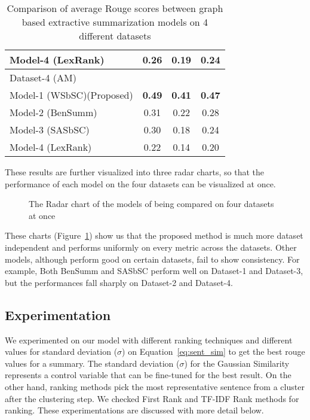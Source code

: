 \begin{table}[]
\begin{tabular}{lccc}
         Model-4 (LexRank)~\cite{Erkan-lexRank-2004}                    & 0.26          & 0.19          & 0.24          \\\hline
         Dataset-4 (AM)                                                 &               &               &               \\\hline
         Model-1 (WSbSC)(Proposed)                                      & \textbf{0.49} & \textbf{0.41} & \textbf{0.47} \\
         Model-2 (BenSumm)~\cite{chowdhury-etal-2021-tfidf-clustering}  & 0.31          & 0.22          & 0.28          \\
         Model-3 (SASbSC)~\cite{roychowdhury-etal-2022-spectral-base}   & 0.30          & 0.18          & 0.24          \\
         Model-4 (LexRank)~\cite{Erkan-lexRank-2004}                    & 0.22          & 0.14          & 0.20          \\
    \end{tabular}
    \caption{Comparison of average Rouge scores between graph based extractive summarization models on 4 different datasets}
    \label{tab:result_comparison-1}
\end{table}

These results are further visualized into three radar charts,
so that the performance of each model on the four datasets can be visualized at once.

\begin{figure}
    \centering
    
    \caption{The Radar chart of the models of being compared on four datasets at once}
    \label{fig:radarchart}
 \end{figure}

These charts (Figure~\ref{fig:radarchart})
show us that the proposed method is much more dataset independent and performs
uniformly on every metric across the datasets.
Other models, although perform good on certain datasets, fail to show consistency.
For example, Both BenSumm and SASbSC perform well on Dataset-1 and Dataset-3, but
the performances fall sharply on Dataset-2 and Dataset-4.

\subsection{Experimentation}\label{subsec:experimentation}
We experimented on our model with different ranking techniques and different values for standard deviation ($\sigma$)
on Equation~\ref{eq:sent_sim} to get the best rouge values for a summary.
The standard deviation ($\sigma$) for the Gaussian Similarity represents a control variable
that can be fine-tuned for the best result.
On the other hand, ranking methods pick the most representative sentence from a cluster after the clustering step.
We checked First Rank and TF-IDF Rank methods for ranking.
These experimentations are discussed with more detail below.

